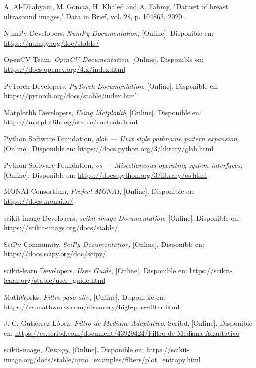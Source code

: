 \documentclass[12pt]{article}
\begin{document}
\begin{thebibliography}{9}

A. Al-Dhabyani, M. Gomaa, H. Khaled and A. Fahmy, "Dataset of breast ultrasound images," Data in Brief, vol. 28, p. 104863, 2020.

NumPy Developers, \textit{NumPy Documentation}, [Online]. Disponible en: \url{https://numpy.org/doc/stable/}

OpenCV Team, \textit{OpenCV Documentation}, [Online]. Disponible en: \url{https://docs.opencv.org/4.x/index.html}

PyTorch Developers, \textit{PyTorch Documentation}, [Online]. Disponible en: \url{https://pytorch.org/docs/stable/index.html}

Matplotlib Developers, \textit{Using Matplotlib}, [Online]. Disponible en: \url{https://matplotlib.org/stable/contents.html}

Python Software Foundation, \textit{glob — Unix style pathname pattern expansion}, [Online]. Disponible en: \url{https://docs.python.org/3/library/glob.html}

Python Software Foundation, \textit{os — Miscellaneous operating system interfaces}, [Online]. Disponible en: \url{https://docs.python.org/3/library/os.html}

MONAI Consortium, \textit{Project MONAI}, [Online]. Disponible en: \url{https://docs.monai.io/}

scikit-image Developers, \textit{scikit-image Documentation}, [Online]. Disponible en: \url{https://scikit-image.org/docs/stable/}

SciPy Community, \textit{SciPy Documentation}, [Online]. Disponible en: \url{https://docs.scipy.org/doc/scipy/}

scikit-learn Developers, \textit{User Guide}, [Online]. Disponible en: \url{https://scikit-learn.org/stable/user_guide.html}

MathWorks, \textit{Filtro paso alto}, [Online]. Disponible en: \url{https://es.mathworks.com/discovery/high-pass-filter.html}

J. C. Gutiérrez López, \textit{Filtro de Mediana Adaptativo}, Scribd, [Online]. Disponible en: \url{https://es.scribd.com/document/43929424/Filtro-de-Mediana-Adaptativo}

scikit-image, \textit{Entropy}, [Online]. Disponible en: \url{https://scikit-image.org/docs/stable/auto_examples/filters/plot_entropy.html}


\end{thebibliography}
\end{document}

